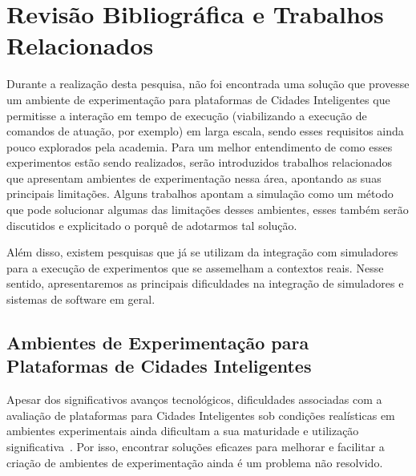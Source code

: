 \chapter{Revisão Bibliográfica e Trabalhos Relacionados}
\label{cap:trab-relacionados}

Durante a realização desta pesquisa, não foi encontrada uma solução que provesse um ambiente de experimentação para plataformas de Cidades Inteligentes que permitisse a interação em tempo de execução 
(viabilizando a execução de comandos de atuação, por exemplo) em larga escala, sendo esses requisitos ainda pouco explorados pela academia.
Para um melhor entendimento de como esses experimentos estão sendo realizados, serão introduzidos trabalhos relacionados que apresentam ambientes de experimentação nessa área, apontando as suas
principais limitações.
Alguns trabalhos apontam a simulação como um método que pode solucionar algumas das limitações desses ambientes, esses também serão discutidos e explicitado o porquê de adotarmos tal solução.

Além disso, existem pesquisas que já se utilizam da integração com simuladores para a execução de experimentos que se assemelham a contextos reais.
Nesse sentido, apresentaremos as principais dificuldades na integração de simuladores e sistemas de software em geral.


\section{Ambientes de Experimentação para Plataformas de Cidades Inteligentes}


Apesar dos significativos avanços tecnológicos, dificuldades associadas com a avaliação de plataformas para Cidades Inteligentes sob condições realísticas em ambientes experimentais ainda dificultam
a sua maturidade e utilização significativa~\cite{sanchez_2014}.
Por isso, encontrar soluções eficazes para melhorar e facilitar a criação de ambientes de experimentação ainda é um problema não resolvido.

